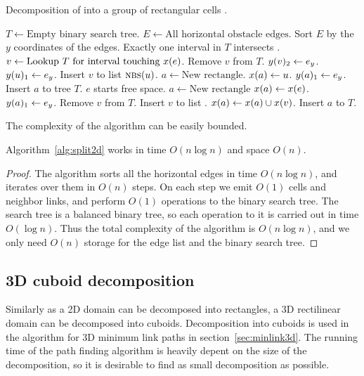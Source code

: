 \documentclass[english,gradu]{tktltiki2018}
\begin{document}
\begin{alg}\label{alg:split2d}
Decomposition of \fspace into a group of rectangular cells .
\begin{algorithmic}
\State $T\gets \text{Empty binary search tree}$.
\State $E\gets\text{All horizontal obstacle edges}$.
\State Sort $E$ by the $y$ coordinates of the edges.
		\Comment Exactly one interval in $T$ intersects .
		\State $v\gets\text{Lookup $T$ for interval touching \ensuremath{x(e)}}$.
		\State Remove $v$ from $T$.
		\State $y(v)_{2}\gets{e}_y$.
			\State $y(u)_{1}\gets{e}_y$.
			\State Insert $v$ to list $\textsc{nbs}{(u)}$.
			\State $a\gets\text{New rectangle}$.
			\State $x(a)\gets u$.
			\State $y(a)_{1}\gets{e}_y$.
			\State Insert $a$ to tree $T$.
		\EndFor
	\Else\Comment $e$ starts free space.
		\State $a\gets\text{New rectangle}$
		\State $x(a)\gets x(e)$.
		\State $y(a)_{1}\gets{e}_y$.
			\State Remove $v$ from $T$.
			\State Insert $v$ to list .
			\State $x(a)\gets x(a)\cup x(v)$.
		\EndFor
		\State Insert $a$ to $T$.
	\EndIf
\EndFor
\end{algorithmic}
\end{alg}

The complexity of the algorithm can be easily bounded.

\begin{lem}\label{lem:split2dtime}Algorithm~\ref{alg:split2d} works in time $O(n\log n)$ and space $O(n)$.\end{lem}
\begin{proof}
The algorithm sorts all the horizontal edges in time $O(n\log n)$, and iterates over them in $O(n)$ steps.
On each step we emit $O(1)$ cells and neighbor links, and perform $O(1)$ operations to the binary search tree.
The search tree is a balanced binary tree, so each operation to it is carried out in time $O(\log n)$.
Thus the total complexity of the algorithm is $O(n\log n)$, and we only need $O(n)$ storage for the edge list and the binary search tree.
\end{proof}

\subsection{3D cuboid decomposition}

Similarly as a 2D domain can be decomposed into rectangles, a 3D rectilinear domain can be decomposed into cuboids.
Decomposition into cuboids is used in the algorithm for 3D minimum link paths in section~\ref{sec:minlink3d}.
The running time of the path finding algorithm is heavily depent on the size of the decomposition, so it is desirable to find as small decomposition as possible.
\end{document}
